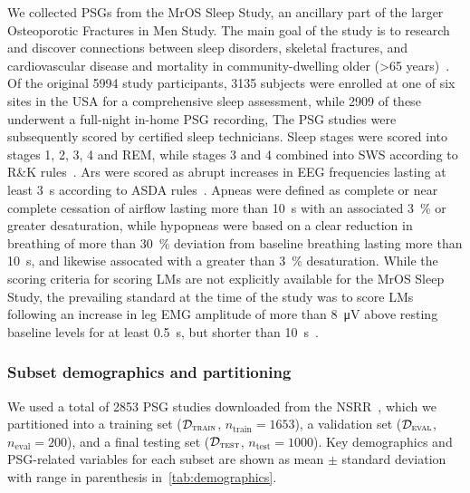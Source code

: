 We collected \acp{PSG} from the MrOS Sleep Study, an ancillary part of the larger Osteoporotic Fractures in Men Study.
The main goal of the study is to research and discover connections between sleep disorders, skeletal fractures, and cardiovascular disease and mortality in community-dwelling older (\num{>65} years)~\cite{Blank2005,Orwoll2005,Blackwell2011}.
Of the original 5994 study participants, 3135 subjects were enrolled at one of six sites in the USA for a comprehensive sleep assessment, while 2909 of these underwent a full-night in-home \ac{PSG} recording,
The \ac{PSG} studies were subsequently scored by certified sleep technicians.
Sleep stages were scored into stages 1, 2, 3, 4 and \ac{REM}, while stages 3 and 4 combined into \ac{SWS} according to R\&K rules~\cite{Rechtschaffen1968}.
\acp{Ar} were scored as abrupt increases in \ac{EEG} frequencies lasting at least \SI{3}{\second} according to \ac{ASDA} rules~\cite{AmericanSleepDisordersAssociation1992}.
Apneas were defined as complete or near complete cessation of airflow lasting more than \SI{10}{\second} with an associated \SI{3}{\percent} or greater  desaturation, while hypopneas were based on a clear reduction in breathing of more than \SI{30}{\percent} deviation from baseline breathing lasting more than \SI{10}{\second}, and likewise assocated with a greater than \SI{3}{\percent}  desaturation.
While the scoring criteria for scoring \acp{LM} are not explicitly available for the MrOS Sleep Study, the prevailing standard at the time of the study was to score \acp{LM} following an increase in leg \ac{EMG} amplitude of more than \SI{8}{\micro\volt} above resting baseline levels for at least \SI{0.5}{\second}, but shorter than \SI{10}{\second}~\cite{Zucconi2006}.

\subsubsection{Subset demographics and partitioning}
We used a total of \num{2853} \ac{PSG} studies downloaded from the \ac{NSRR}~\cite{Dean2016,Zhang2018}, which we partitioned into a training set (\(\mathcal{D}_\textsc{train}\), \( n_{\text{train}} = 1653 \)), a validation set (\(\mathcal{D}_\textsc{eval}\), \(n_{\text{eval}} = 200\)), and a final testing set (\(\mathcal{D}_\textsc{test}\), \(n_{\text{test}} = 1000 \)).
Key demographics and \ac{PSG}-related variables for each subset are shown as mean \(\pm\) standard deviation with range in parenthesis in~\cref{tab:demographics}.

